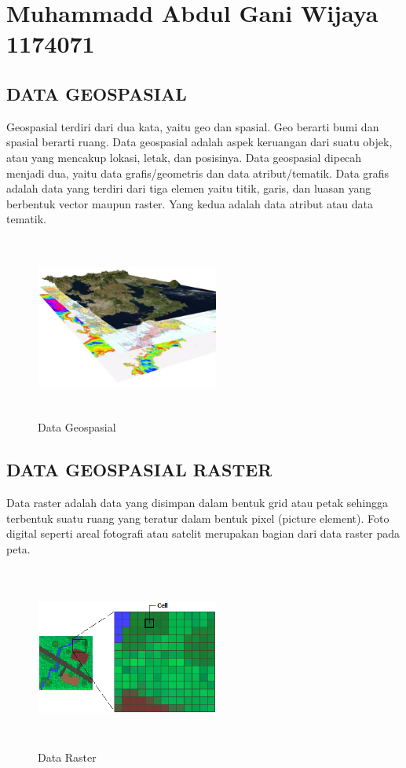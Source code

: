 \section{Muhammadd Abdul Gani Wijaya 1174071}
\subsection{DATA GEOSPASIAL} 
Geospasial terdiri dari dua kata, yaitu geo dan spasial. Geo berarti bumi dan spasial berarti ruang. Data geospasial adalah aspek keruangan dari suatu objek, atau yang mencakup lokasi, letak, dan posisinya. Data geospasial dipecah menjadi dua, yaitu data grafis/geometris dan data atribut/tematik. Data grafis adalah data yang terdiri dari tiga elemen yaitu titik, garis, dan luasan yang berbentuk vector maupun raster. Yang kedua adalah data atribut atau data tematik.
\begin{figure}[!htbp]
\centering
\includegraphics[width=6cm,height=6cm]{figures/Tugas1/1174071/Geospasial.jpg}
\caption{Data Geospasial}
\end{figure}	
\subsection{DATA GEOSPASIAL RASTER}
Data raster adalah data yang disimpan dalam bentuk grid atau petak sehingga terbentuk suatu ruang yang teratur dalam bentuk pixel (picture element). Foto digital seperti areal fotografi atau satelit merupakan bagian dari data raster pada peta.
\begin{figure}[!htbp]
\centering
\includegraphics[width=6cm,height=6cm]{figures/Tugas1/1174071/Raster.png}
\caption{Data Raster}
\end{figure}	
